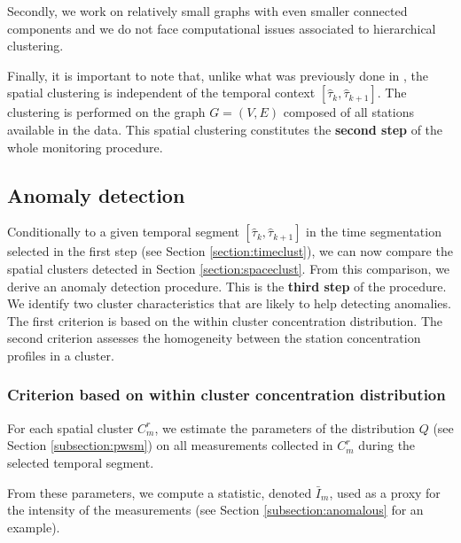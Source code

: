 Secondly, we work on relatively small graphs with even smaller connected components and we do not face computational issues associated to hierarchical clustering. 

Finally, it is important to note that, unlike what was previously done in \cite{Laroche2022}, the spatial clustering is independent of the temporal context $[\widehat{\tau}_k,\widehat{\tau}_{k+1}]$. The clustering is performed on the graph $G=(V,E)$ composed of all stations available in the data. This spatial clustering constitutes the \textbf{second step} of the whole monitoring procedure.

\subsection{Anomaly detection}\label{section:anomaly}

Conditionally to a given temporal segment $[\widehat{\tau}_k,\widehat{\tau}_{k+1}]$ in the time segmentation selected in the first step (see Section \ref{section:timeclust}), we can now compare the spatial clusters detected in Section \ref{section:spaceclust}. From this comparison, we derive an anomaly detection procedure. This is the \textbf{third step} of the procedure. We identify two cluster characteristics that are likely to help detecting anomalies. The first criterion is based on the within cluster concentration distribution. The second criterion assesses the homogeneity between the station concentration profiles in a cluster.  




\subsubsection{Criterion based on within cluster concentration distribution}

For each spatial cluster $C^r_m$, we estimate the parameters of the distribution $Q$ (see Section \ref{subsection:pwsm}) on all measurements collected in $C^r_m$ during the selected temporal segment. 

From these parameters, we compute a statistic, denoted $\bar{I}_m$, used as a proxy for the intensity of the measurements (see Section \ref{subsection:anomalous} for an example). 


